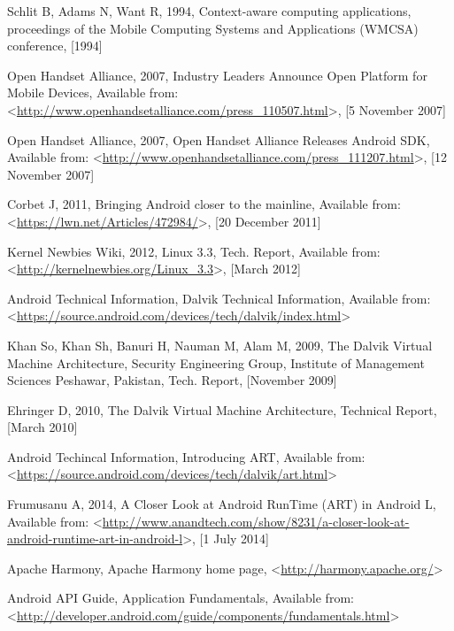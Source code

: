 \begin{thebibliography}{99}

 Schlit B, Adams N, Want R, 1994, Context-aware computing applications, proceedings of the Mobile Computing Systems and Applications (WMCSA) conference, [1994]

 Open Handset Alliance, 2007, Industry Leaders Announce Open Platform for Mobile Devices, Available from: <\url{http://www.openhandsetalliance.com/press_110507.html}>, [5 November 2007]

 Open Handset Alliance, 2007, Open Handset Alliance Releases Android SDK, Available from: <\url{http://www.openhandsetalliance.com/press_111207.html}>, [12 November 2007]

 Corbet J, 2011, Bringing Android closer to the mainline,  Available from: <\url{https://lwn.net/Articles/472984/}>, [20 December 2011]

 Kernel Newbies Wiki, 2012, Linux 3.3, Tech. Report, Available from: <\url{http://kernelnewbies.org/Linux_3.3}>, [March 2012]

 Android Technical Information, Dalvik Technical Information, Available from: <\url{https://source.android.com/devices/tech/dalvik/index.html}>

 Khan So, Khan Sh, Banuri H, Nauman M, Alam M, 2009, The Dalvik Virtual Machine Architecture, Security Engineering Group, Institute of Management Sciences Peshawar, Pakistan, Tech. Report, [November 2009]

 Ehringer D, 2010, The Dalvik Virtual Machine Architecture, Technical Report, [March 2010]

 Android Techincal Information, Introducing ART, Available from: <\url{https://source.android.com/devices/tech/dalvik/art.html}>

 Frumusanu A, 2014, A Closer Look at Android RunTime (ART) in Android L, Available from: <\url{http://www.anandtech.com/show/8231/a-closer-look-at-android-runtime-art-in-android-l}>, [1 July 2014]

 Apache Harmony, Apache Harmony home page, <\url{http://harmony.apache.org/}>

 Android API Guide, Application Fundamentals, Available from: <\url{http://developer.android.com/guide/components/fundamentals.html}>


\end{thebibliography}
